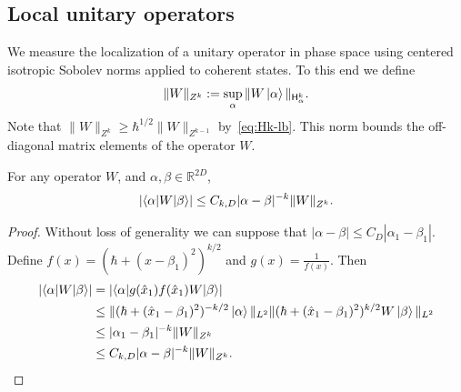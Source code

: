 \documentclass[11pt]{amsart}
\def\Sobolev{{\mathsf{H}}}
\def\Real{{\mathbb R}}
\def\ket#1{\mathinner{|{#1}\rangle}}
\def\Braket#1{\!\mathinner{\langle{#1}\rangle}\!}
\numberwithin{equation}{section}
\begin{document}
\subsection{Local unitary operators}
\label{sec:W-local}
We measure the localization of a unitary operator in phase space using centered isotropic Sobolev norms applied
to coherent states.  To this end we define
\[
\|W\|_{Z^k} := \sup_\alpha \|W\ket{\alpha}\|_{\Sobolev^k_\alpha}.
\]
Note that $\|W\|_{Z^k} \geq \hbar^{1/2} \|W\|_{Z^{k-1}}$ by~\eqref{eq:Hk-lb}.
This norm bounds the off-diagonal matrix elements of the operator $W$.
\begin{lemma}
\label{lem:Z-offdiag}
For any operator $W$, and $\alpha,\beta\in\Real^{2D}$,
\[
|\Braket{\alpha|W|\beta}|
\leq C_{k,D} |\alpha-\beta|^{-k} \|W\|_{Z^k}.
\]
\end{lemma}
\begin{proof}
Without loss of generality we can suppose that $|\alpha-\beta| \leq C_{D} |\alpha_{1}-\beta_{1}|$.
Define $f(x) = (\hbar + (x - \beta_{1})^2)^{k/2}$ and $g(x) = \frac{1}{f(x)}$.  Then
\begin{align*}
|\Braket{\alpha|W|\beta}|
&= |\Braket{\alpha| g(\hat{x}_1) f(\hat{x}_1) W |\beta}| \\
&\leq
\| (\hbar + (\hat{x}_1-\beta_{1})^2)^{-k/2} \ket{\alpha}\|_{L^2}
\| (\hbar + (\hat{x}_1-\beta_{1})^2)^{k/2} W\ket{\beta}\|_{L^2} \\
&\leq |\alpha_{1}-\beta_{1}|^{-k}\|W\|_{Z^k} \\
&\leq C_{k,D} |\alpha-\beta|^{-k} \|W\|_{Z^k}.
\end{align*}
\end{proof}
\end{document}
